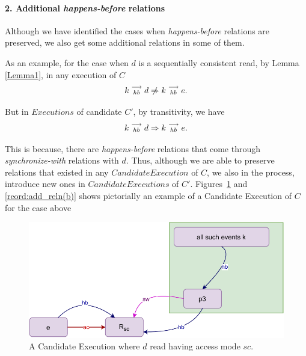 
\paragraph{2. Additional \textit{happens-before} relations}
    Although we have identified the cases when \textit{happens-before} relations are preserved, we also get some additional relations in some of them.

    As an example, for the case when $d$ is a sequentially consistent read, by Lemma \ref{Lemma1}, in any execution of $C$
    \[
        \reln{k}{hb}{d} \centernot\Rightarrow \reln{k}{hb}{e}. 
    \]

    But in $Executions$ of candidate $C'$, by transitivity, we have 
    \[
        k\stackrel{\longrightarrow}{_{hb}}d \Rightarrow k\stackrel{\longrightarrow}{_{hb}}e. 
    \]

    This is because, there are \textit{happens-before} relations that come through \textit{synchronize-with} relations with $d$. 
    Thus, although we are able to preserve relations that existed in any $Candidate Execution$ of $C$, we also in the process, introduce new ones in $Candidate Executions$ of $C'$. 
    Figures~\ref{reord:add_reln(a)} and \ref{reord:add_reln(b)} shows pictorially an example of a Candidate Execution of $C$ for the case above 
    \begin{figure}[H]
        \centering
        \includegraphics[scale=0.7]{4.InstructionReordering/4.ValidReorderingCandidate/ProofParts/Part2/part2(c).pdf}
        \caption{A Candidate Execution where $d$ read having access mode $sc$.}
        \label{reord:add_reln(a)}
    \end{figure}

